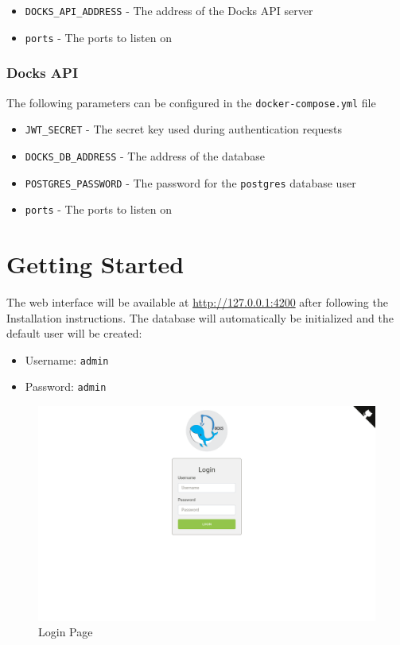 \documentclass[]{article}
\providecommand{\tightlist}{%
	\setlength{\itemsep}{0pt}\setlength{\parskip}{0pt}}
\let\oldtexttt\texttt
\renewcommand{\texttt}[1]{
	\colorbox{Light}{\oldtexttt{#1}}
}
\begin{document}
\begin{itemize}
	\tightlist
	\item \texttt{DOCKS\_API\_ADDRESS} - The address of the Docks API server
	\item \texttt{ports} - The ports to listen on
\end{itemize}

\subsubsection{Docks API}
The following parameters can be configured in the \texttt{docker-compose.yml} file

\begin{itemize}
	\tightlist
	\item \texttt{JWT\_SECRET} - The secret key used during authentication requests
	\item \texttt{DOCKS\_DB\_ADDRESS} - The address of the database
	\item \texttt{POSTGRES\_PASSWORD} - The password for the \texttt{postgres} database user
	\item \texttt{ports} - The ports to listen on
\end{itemize}

\section{Getting Started}
The web interface will be available at \url{http://127.0.0.1:4200} after following the Installation instructions.
The database will automatically be initialized and the default user will
be created:
\begin{itemize}
	\tightlist
	\item Username: \texttt{admin}
	\item Password: \texttt{admin}
\end{itemize}

\begin{figure}[h!]
	\centering
	\includegraphics[scale=0.4]{login.png}
	\caption{Login Page}
\end{figure}
\end{document}
